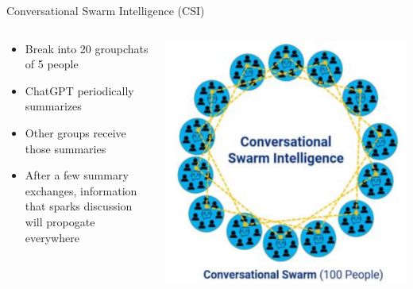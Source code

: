 \documentclass[aspectratio=169]{beamer}
\begin{document}
\begin{frame}{Conversational Swarm Intelligence (CSI)}
\begin{columns}[T]
    \begin{column}[T]{0.5\textwidth}
        \begin{itemize}
            \item Break into 20 groupchats of 5 people
            \item ChatGPT periodically summarizes
            \item Other groups receive those summaries
            \item After a few summary exchanges, information that sparks discussion will propogate everywhere
        \end{itemize}
    \end{column}
    \begin{column}{0.5\textwidth}
        \includegraphics[height=0.8\textheight]{imgs/CSI_section/conversational_swarm.png}
    \end{column}
\end{columns}
\end{frame}
\end{document}
